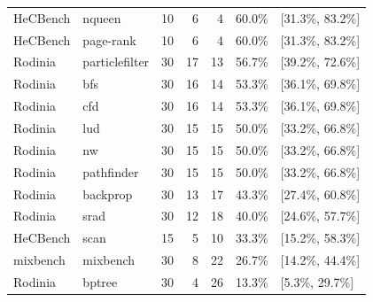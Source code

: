 \begin{table}[htbp]
\begin{tabular}{@{}llrrrrl@{}}
HeCBench & nqueen & 10 & 6 & 4 & 60.0\% & [31.3\%, 83.2\%] \\
HeCBench & page-rank & 10 & 6 & 4 & 60.0\% & [31.3\%, 83.2\%] \\
Rodinia & particlefilter & 30 & 17 & 13 & 56.7\% & [39.2\%, 72.6\%] \\
Rodinia & bfs & 30 & 16 & 14 & 53.3\% & [36.1\%, 69.8\%] \\
Rodinia & cfd & 30 & 16 & 14 & 53.3\% & [36.1\%, 69.8\%] \\
Rodinia & lud & 30 & 15 & 15 & 50.0\% & [33.2\%, 66.8\%] \\
Rodinia & nw & 30 & 15 & 15 & 50.0\% & [33.2\%, 66.8\%] \\
Rodinia & pathfinder & 30 & 15 & 15 & 50.0\% & [33.2\%, 66.8\%] \\
\midrule
Rodinia & backprop & 30 & 13 & 17 & 43.3\% & [27.4\%, 60.8\%] \\
Rodinia & srad & 30 & 12 & 18 & 40.0\% & [24.6\%, 57.7\%] \\
HeCBench & scan & 15 & 5 & 10 & 33.3\% & [15.2\%, 58.3\%] \\
mixbench & mixbench & 30 & 8 & 22 & 26.7\% & [14.2\%, 44.4\%] \\
Rodinia & bptree & 30 & 4 & 26 & 13.3\% & [5.3\%, 29.7\%] \\

\end{tabular}
\end{table}
